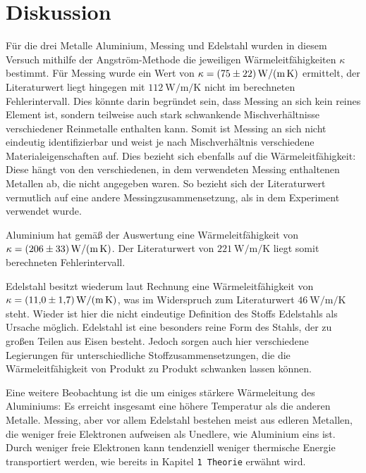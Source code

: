 \section{Diskussion}
\label{sec:Diskussion}
Für die drei Metalle Aluminium, Messing und Edelstahl wurden in diesem Versuch mithilfe der Angström-Methode 
die jeweiligen Wärmeleitfähigkeiten $\kappa$ bestimmt.
Für Messing wurde ein Wert von $\kappa = \SI{75 \pm 22}{\watt\per\meter\per\kelvin}$ ermittelt, der Literaturwert liegt 
hingegen mit $\SI{112}{\watt\per\meter\per\kelvin}$ nicht im berechneten Fehlerintervall. 
Dies könnte darin begründet sein, dass Messing an sich kein reines Element ist, sondern teilweise auch stark schwankende 
Mischverhältnisse verschiedener Reinmetalle enthalten kann. 
Somit ist Messing an sich nicht eindeutig identifizierbar und weist je nach Mischverhältnis verschiedene 
Materialeigenschaften auf. 
Dies bezieht sich ebenfalls auf die Wärmeleitfähigkeit: Diese hängt von den verschiedenen, in dem verwendeten 
Messing enthaltenen Metallen ab, die nicht angegeben waren. So bezieht sich der Literaturwert vermutlich auf eine andere
Messingzusammensetzung, als in dem Experiment verwendet wurde. 

Aluminium hat gemäß der Auswertung eine Wärmeleitfähigkeit von $\kappa = \SI{206 \pm 33}{\watt\per\meter\per\kelvin}$.
Der Literaturwert von $\SI{221}{\watt\per\meter\per\kelvin}$ liegt somit berechneten Fehlerintervall.

Edelstahl besitzt wiederum laut Rechnung eine Wärmeleitfähigkeit von $\kappa = \SI{11.0 \pm 1.7}{\watt\per\meter\per\kelvin}$, 
was im Widerspruch zum Literaturwert $\SI{46}{\watt\per\meter\per\kelvin}$ steht. 
Wieder ist hier die nicht eindeutige Definition des Stoffs Edelstahls als Ursache möglich. 
Edelstahl ist eine besonders reine Form des Stahls, der zu großen Teilen aus Eisen besteht. 
Jedoch sorgen auch hier verschiedene Legierungen für unterschiedliche Stoffzusammensetzungen, die die Wärmeleitfähigkeit 
von Produkt zu Produkt schwanken lassen können. 

Eine weitere Beobachtung ist die um einiges stärkere Wärmeleitung des Aluminiums: Es erreicht insgesamt eine höhere Temperatur
als die anderen Metalle. Messing, aber vor allem Edelstahl bestehen meist aus edleren Metallen, die weniger freie Elektronen 
aufweisen als Unedlere, wie Aluminium eins ist. Durch weniger freie Elektronen kann tendenziell weniger thermische 
Energie transportiert werden, wie bereits in Kapitel \texttt{1 Theorie} erwähnt wird. 
